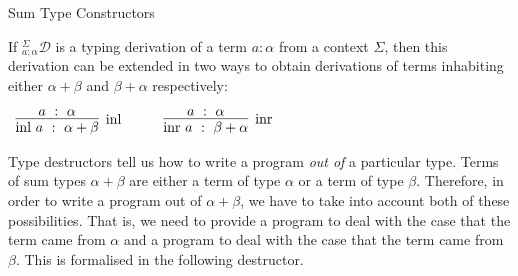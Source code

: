 \documentclass{book}
\begin{document}
    \begin{definition}{Sum Type Constructors}

        If $^{\Sigma}_{a : \alpha}\mathcal{D}$ is a typing derivation of a term $a : \alpha$ from a context $\Sigma$, then this derivation can be extended in two ways to obtain derivations of terms inhabiting either $\alpha + \beta$ and $\beta + \alpha$ respectively: 

        \begin{center}
            $\begin{array}{c c c}
              \infer[\text{\inl}]{\inl \ a \ : \ \alpha + \beta}{a \ : \ \alpha}
        
              &
              \quad
              &
        
              \infer[\text{\inr}]{\inr \ a \ : \ \beta + \alpha}{a \ : \ \alpha}
        
            \end{array}$
          \end{center}
    \end{definition}

    Type destructors tell us how to write a program \emph{out of} a particular type. Terms of sum types $\alpha + \beta$ are either a term of type $\alpha$ or a term of type $\beta$. Therefore, in order to write a program out of $\alpha + \beta$, we have to take into account both of these possibilities. That is, we need to provide a program to deal with the case that the term came from $\alpha$ and a program to deal with the case that the term came from $\beta$. This is formalised in the following destructor. 
\end{document}
